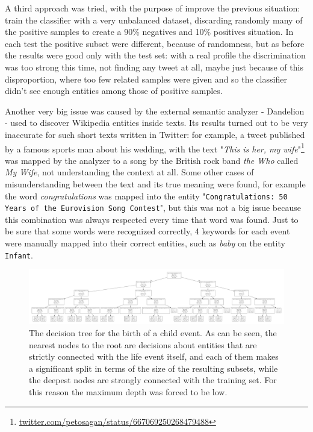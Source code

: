 A third approach was tried, with the purpose of improve the previous situation: train the classifier with a very unbalanced dataset, discarding randomly many of the positive samples to create a 90\% negatives and 10\% positives situation. In each test the positive subset were different, because of randomness, but as before the results were good only with the test set: with a real profile the discrimination was too strong this time, not finding any tweet at all, maybe just because of this disproportion, where too few related samples were given and so the classifier didn't see enough entities among those of positive samples.

Another very big issue was caused by the external semantic analyzer - Dandelion - used to discover Wikipedia entities inside texts. Its results turned out to be very inaccurate for such short texts written in Twitter: for example, a tweet published by a famous sports man about his wedding, with the text "\textit{This is her, my wife}"\footnote{\url{twitter.com/petosagan/status/667069250268479488}} was mapped by the analyzer to a song by the British rock band \emph{the Who} called \emph{My Wife}, not understanding the context at all. Some other cases of misunderstanding between the text and its true meaning were found, for example the word \emph{congratulations} was mapped into the entity "\texttt{Congratulations: 50 Years of the Eurovision Song Contest}", but this was not a big issue because this combination was always respected every time that word was found. Just to be sure that some words were recognized correctly, 4 keywords for each event were manually mapped into their correct entities, such as \emph{baby} on the entity \texttt{Infant}.

\begin{figure}
\centering
\includegraphics[width=%
1\textwidth]{img/decisiontree}
\caption{The decision tree for the birth of a child event. As can be seen, the nearest nodes to the root are decisions about entities that are strictly connected with the life event itself, and each of them makes a significant split in terms of the size of the resulting subsets, while the deepest nodes are strongly connected with the training set. For this reason the maximum depth was forced to be low.}
\label{fig:decisiontree}
\end{figure}

